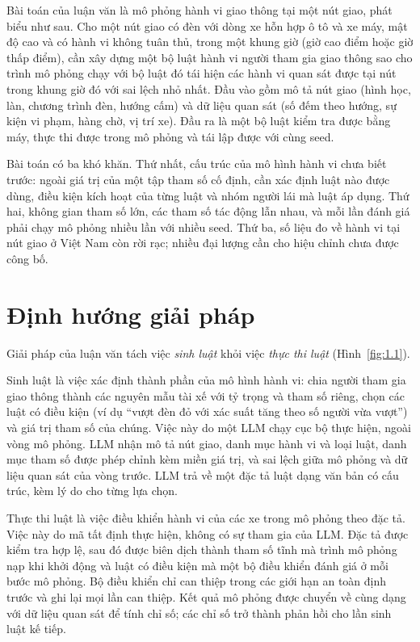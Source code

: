\documentclass[../main.tex]{subfiles}
\begin{document}
Bài toán của luận văn là mô phỏng hành vi giao thông tại một nút giao, phát biểu như sau. Cho một nút giao có đèn với dòng xe hỗn hợp ô tô và xe máy, mật độ cao và có hành vi không tuân thủ, trong một khung giờ (giờ cao điểm hoặc giờ thấp điểm), cần xây dựng một bộ luật hành vi người tham gia giao thông sao cho trình mô phỏng chạy với bộ luật đó tái hiện các hành vi quan sát được tại nút trong khung giờ đó với sai lệch nhỏ nhất. Đầu vào gồm mô tả nút giao (hình học, làn, chương trình đèn, hướng cấm) và dữ liệu quan sát (số đếm theo hướng, sự kiện vi phạm, hàng chờ, vị trí xe). Đầu ra là một bộ luật kiểm tra được bằng máy, thực thi được trong mô phỏng và tái lập được với cùng seed.

Bài toán có ba khó khăn. Thứ nhất, cấu trúc của mô hình hành vi chưa biết trước: ngoài giá trị của một tập tham số cố định, cần xác định luật nào được dùng, điều kiện kích hoạt của từng luật và nhóm người lái mà luật áp dụng. Thứ hai, không gian tham số lớn, các tham số tác động lẫn nhau, và mỗi lần đánh giá phải chạy mô phỏng nhiều lần với nhiều seed. Thứ ba, số liệu đo về hành vi tại nút giao ở Việt Nam còn rời rạc; nhiều đại lượng cần cho hiệu chỉnh chưa được công bố.

\section{Định hướng giải pháp}
\label{section:1.3}

Giải pháp của luận văn tách việc \emph{sinh luật} khỏi việc \emph{thực thi luật} (Hình~\ref{fig:1.1}).

Sinh luật là việc xác định thành phần của mô hình hành vi: chia người tham gia giao thông thành các nguyên mẫu tài xế với tỷ trọng và tham số riêng, chọn các luật có điều kiện (ví dụ ``vượt đèn đỏ với xác suất tăng theo số người vừa vượt'') và giá trị tham số của chúng. Việc này do một LLM chạy cục bộ thực hiện, ngoài vòng mô phỏng. LLM nhận mô tả nút giao, danh mục hành vi và loại luật, danh mục tham số được phép chỉnh kèm miền giá trị, và sai lệch giữa mô phỏng và dữ liệu quan sát của vòng trước. LLM trả về một đặc tả luật dạng văn bản có cấu trúc, kèm lý do cho từng lựa chọn.

Thực thi luật là việc điều khiển hành vi của các xe trong mô phỏng theo đặc tả. Việc này do mã tất định thực hiện, không có sự tham gia của LLM. Đặc tả được kiểm tra hợp lệ, sau đó được biên dịch thành tham số tĩnh mà trình mô phỏng nạp khi khởi động và luật có điều kiện mà một bộ điều khiển đánh giá ở mỗi bước mô phỏng. Bộ điều khiển chỉ can thiệp trong các giới hạn an toàn định trước và ghi lại mọi lần can thiệp. Kết quả mô phỏng được chuyển về cùng dạng với dữ liệu quan sát để tính chỉ số; các chỉ số trở thành phản hồi cho lần sinh luật kế tiếp.
\end{document}
